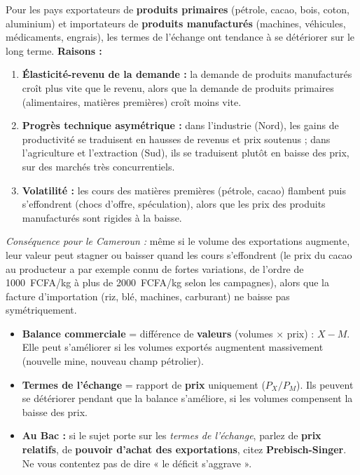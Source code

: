 \documentclass[11pt]{article}
\begin{document}
\begin{propriete}
Pour les pays exportateurs de \textbf{produits primaires} (pétrole, cacao, bois, coton, aluminium) et importateurs de \textbf{produits manufacturés} (machines, véhicules, médicaments, engrais), les termes de l'échange ont tendance à se détériorer sur le long terme.
\textbf{Raisons :}
\begin{enumerate}
    \item \textbf{Élasticité-revenu de la demande :} la demande de produits manufacturés croît plus vite que le revenu, alors que la demande de produits primaires (alimentaires, matières premières) croît moins vite.
    \item \textbf{Progrès technique asymétrique :} dans l'industrie (Nord), les gains de productivité se traduisent en hausses de revenus et prix soutenus ; dans l'agriculture et l'extraction (Sud), ils se traduisent plutôt en baisse des prix, sur des marchés très concurrentiels.
    \item \textbf{Volatilité :} les cours des matières premières (pétrole, cacao) flambent puis s'effondrent (chocs d'offre, spéculation), alors que les prix des produits manufacturés sont rigides à la baisse.
\end{enumerate}
\emph{Conséquence pour le Cameroun :} même si le volume des exportations augmente, leur valeur peut stagner ou baisser quand les cours s'effondrent (le prix du cacao au producteur a par exemple connu de fortes variations, de l'ordre de \SI{1000}{FCFA/kg} à plus de \SI{2000}{FCFA/kg} selon les campagnes), alors que la facture d'importation (riz, blé, machines, carburant) ne baisse pas symétriquement.
\end{propriete}

\begin{attention}
\begin{itemize}
    \item \textbf{Balance commerciale} = différence de \textbf{valeurs} (volumes $\times$ prix) : $X - M$. Elle peut s'améliorer si les volumes exportés augmentent massivement (nouvelle mine, nouveau champ pétrolier).
    \item \textbf{Termes de l'échange} = rapport de \textbf{prix} uniquement ($P_X / P_M$). Ils peuvent se détériorer pendant que la balance s'améliore, si les volumes compensent la baisse des prix.
    \item \textbf{Au Bac :} si le sujet porte sur les \emph{termes de l'échange}, parlez de \textbf{prix relatifs}, de \textbf{pouvoir d'achat des exportations}, citez \textbf{Prebisch-Singer}. Ne vous contentez pas de dire « le déficit s'aggrave ».
\end{itemize}
\end{attention}
\end{document}
